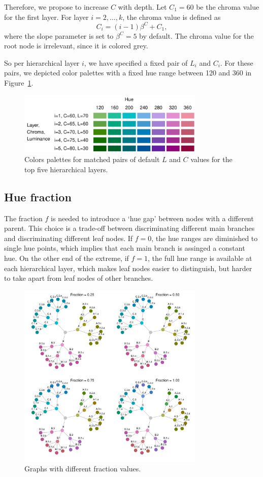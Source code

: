\documentclass[journal]{vgtc}                %
\begin{document}
Therefore, we propose to increase $C$ with depth. Let $C_1=60$ be the chroma value for the first layer. For layer $i=2,\ldots, k$, the chroma value is defined as
\begin{equation}
C_i=(i-1)\beta^C + C_1,
\end{equation}
where the slope parameter is set to $\beta^C=5$ by default. The chroma value for the root node is irrelevant, since it is colored grey.

So per hierarchical layer $i$, we have specified a fixed pair of $L_i$ and $C_i$. For these pairs, we depicted color palettes with a fixed hue range between 120 and 360 in Figure~\ref{fig:lc3}.

\begin{figure}[htb]
  \centering
  \includegraphics[width=3.5in]{LC3.pdf}
  \caption{Colors palettes for matched pairs of default $L$ and $C$ values for the top five hierarchical layers.}\label{fig:lc3}
\end{figure}

\subsection{Hue fraction}\label{secf}

The fraction $f$ is needed to introduce a `hue gap' between nodes with a different parent. This choice is a trade-off between discriminating different main branches and discriminating different leaf nodes. If $f=0$, the hue ranges are diminished to single hue points, which implies that each main branch is assinged a constant hue. On the other end of the extreme, if $f=1$, the full hue range is available at each hierarchical layer, which makes leaf nodes easier to distinguish, but harder to take apart from leaf nodes of other branches.

\begin{figure}[htb]
  \centering
  \includegraphics[width=3.5in]{Graph_hue.pdf}
  \caption{Graphs with different fraction values.}\label{fig:graphf}
\end{figure}
\end{document}
